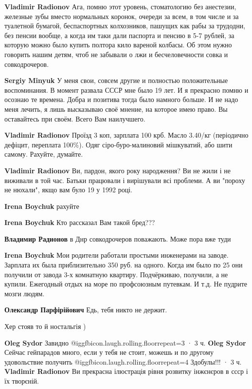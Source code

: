 \begin{itemize}
\begin{itemize} %
\textbf{Vladimir Radionov} Ага, помню этот уровень, стоматологию без анестезии, железные зубы вместо нормальных коронок, очереди за всем, в том числе и за туалетной бумагой, беспаспортных колхозников, пашущих как рабы за трудодни, без пенсии вообще, а когда им таки дали паспорта и пенсию в 5-7 рублей, за которую можно было купить полтора кило вареной колбасы. Об этом нужно говорить нашим детям, чтоб не забывали о лжи и бесчеловечности совка и совкодрочеров.

\textbf{Sergiy Minyuk} У меня свои, совсем другие и полностью положительные
воспоминания. В момент развала СССР мне было 19 лет. И я прекрасно помню и
осознаю те времена. Добра и позитива тогда было намного больше. И не надо меня
лечить, я лишь высказываю своё мнение, на которое имею право. Вы оставайтесь
при своём. Всего Вам наилучшего.

\textbf{Vladimir Radionov} Проїзд 3 коп, зарплата 100 крб. Масло 3.40/кг
(періодично дефіцит, переплата 100\%). Одяг сіро-буро-малиновий мішкуватий, або
шити самому. Рахуйте, думайте.

\textbf{Vladimir Radionov} Ви, пардон, якого року народження? Ви не жили і не виживали в той час. Батьки працювали і вирішували всі проблеми. А ви "пороху не нюхали", якщо вам було 19 у 1992 році.

\textbf{Irena Boychuk} рахуйте

\textbf{Irena Boychuk} Кто рассказал Вам такой бред???

\textbf{Владимир Радионов} в Днр совкодрочеров поважають. Може пора вже туди

\textbf{Irena Boychuk} Мои родители работали простыми инженерами на заводе. Зарплата их была приблизительно 350 руб. на одного. Когда им было по 25 они получили от завода 3-х комнатную квартиру. Подчёркиваю, получили, а не купили. Ежегодный отдых на море по профсоюзным путевкам. И т.д. Не пудрите мозги людям.

\textbf{Олександр Парфірійович} Едь, тебя никто не держит.

Хер стояв то й ностальгія )

\textbf{Oleg Sydor} Завидно @igg{fbicon.laugh.rolling.floor}{repeat=3} 
 · 3 ч.
\textbf{Oleg Sydor} Сейчас гейпарадов много, если у тебя не стоит, можешь и по другому удовольствие получить @igg{fbicon.laugh.rolling.floor}{repeat=4} 
Здобулы!!!
 · 3 ч.
\textbf{Vladimir Radionov} Ви прекрасна ілюстрація рівня розвитку інжєнєров в ссср і їх творєній.


\end{itemize}
\end{itemize}
